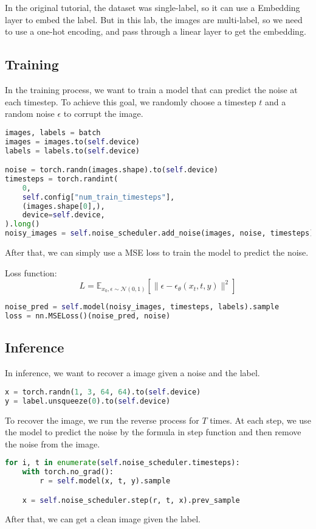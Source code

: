 In the original tutorial, the dataset was single-label, so it can use a Embedding layer to embed the label.
But in this lab, the images are multi-label, so we need to use a one-hot encoding, and pass through a linear layer to get the embedding.

\subsection{Training}
In the training process, we want to train a model that can predict the noise at each timestep.
To achieve this goal, we randomly choose a timestep $t$ and a random noise $\epsilon$ to corrupt the image.

\begin{lstlisting}[language=Python]
images, labels = batch
images = images.to(self.device)
labels = labels.to(self.device)

noise = torch.randn(images.shape).to(self.device)
timesteps = torch.randint(
    0,
    self.config["num_train_timesteps"],
    (images.shape[0],),
    device=self.device,
).long()
noisy_images = self.noise_scheduler.add_noise(images, noise, timesteps)
\end{lstlisting}

After that, we can simply use a MSE loss to train the model to predict the noise.

Loss function:
\begin{equation}
    L = \mathbb{E}_{x_0, \epsilon \sim \mathcal{N}(0, 1)} [\| \epsilon - \epsilon_\theta(x_t, t, y) \|^2]
\end{equation}

\begin{lstlisting}[language=Python]
noise_pred = self.model(noisy_images, timesteps, labels).sample
loss = nn.MSELoss()(noise_pred, noise)
\end{lstlisting}

\subsection{Inference}
In inference, we want to recover a image given a noise and the label.

\begin{lstlisting}[language=Python]
x = torch.randn(1, 3, 64, 64).to(self.device)
y = label.unsqueeze(0).to(self.device)
\end{lstlisting}

To recover the image, we run the reverse process for $T$ times.
At each step, we use the model to predict the noise by the formula in step function and then remove the noise from the image.

\begin{lstlisting}[language=Python]
for i, t in enumerate(self.noise_scheduler.timesteps):
    with torch.no_grad():
        r = self.model(x, t, y).sample

    x = self.noise_scheduler.step(r, t, x).prev_sample
\end{lstlisting}

After that, we can get a clean image given the label.
